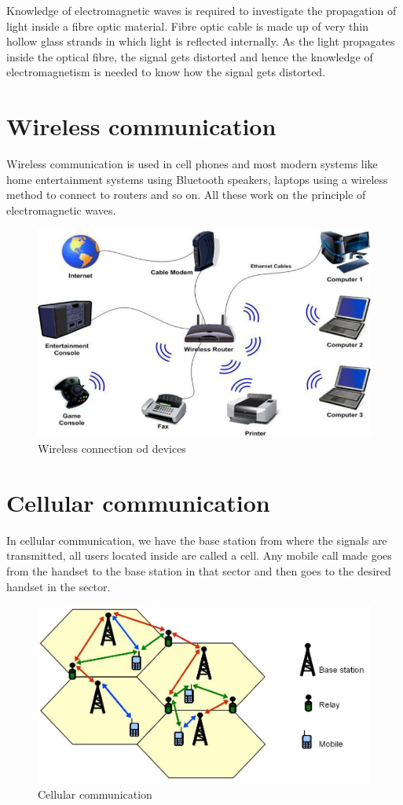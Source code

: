 Knowledge of electromagnetic waves is required to investigate the propagation of light inside a fibre optic material. Fibre optic cable is made up of very thin hollow glass strands in which light is reflected internally. As the light propagates inside the optical fibre, the signal gets distorted and hence the knowledge of electromagnetism is needed to know how the signal gets distorted.

\section{Wireless communication}

Wireless communication is used in cell phones and most modern systems like home entertainment systems using Bluetooth speakers, laptops using a wireless method to connect to routers and so on. All these work on the principle of electromagnetic waves.
\begin{figure}[h]
\centering
\includegraphics[scale=0.3]{./graphics/Expert-support-for-wireless-communication-projects}
\caption{Wireless connection od devices}
\end{figure}
\section{Cellular communication} 

In cellular communication, we have the base station from where the signals are transmitted, all users located inside are called a cell. Any mobile call made goes from the handset to the base station in that sector and then goes to the desired handset in the sector.
\begin{figure}[h]
\centering
\includegraphics[scale=0.3]{./graphics/RR_sada_fig1}
\caption{Cellular communication}
\end{figure}

